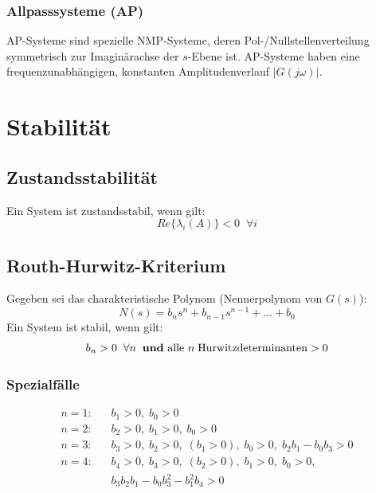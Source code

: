 \documentclass[a4paper,twocolumn,10pt]{article}
\begin{document}
\subsubsection{Allpasssysteme (AP)}
AP-Systeme sind spezielle NMP-Systeme, deren Pol-/Nullstellenverteilung symmetrisch zur Imaginärachse der $s$-Ebene ist. AP-Systeme haben eine frequenzunabhängigen, konstanten Amplitudenverlauf $|G(j\omega)|$.

\section{Stabilität}

\subsection{Zustandsstabilität}
Ein System ist zustandsstabil, wenn gilt:
\begin{equation*}
Re\{\lambda_i(A)\}<0\;\;\forall i
\end{equation*}

\subsection{Routh-Hurwitz-Kriterium}
Gegeben sei das charakteristische Polynom (Nennerpolynom von $G(s)$):
\begin{equation*}
N(s)=b_ns^n+b_{n-1}s^{n-1}+...+b_0
\end{equation*}
Ein System ist stabil, wenn gilt:
\begin{equation*}
b_n>0\;\;\forall n\;\;\text{\textbf{und} alle }n\;\text{Hurwitzdeterminanten}>0
\end{equation*}

\subsubsection{Spezialfälle}
\begin{equation*}
\begin{split}
n=1:&\;\;\;b_1>0,\;b_0>0\\
n=2:&\;\;\;b_2>0,\;b_1>0,\;b_0>0\\
n=3:&\;\;\;b_3>0,\;b_2>0,\;(b_1>0),\;b_0>0,\;b_2b_1-b_0b_3>0\\
n=4:&\;\;\;b_4>0,\;b_3>0,\;(b_2>0),\;b_1>0,\;b_0>0,\\
&\;\;\;b_3b_2b_1-b_0b_3^2-b_1^2b_4>0
\end{split}
\end{equation*}
\end{document}
